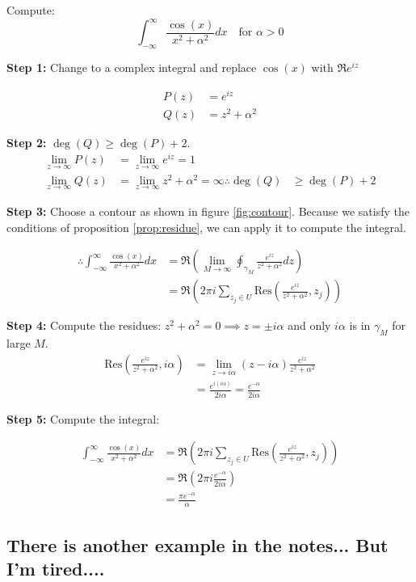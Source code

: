 \begin{example}
    Compute:
    $$\int_{-\infty}^{\infty} \frac{\cos(x)}{x^2 + \alpha^2} dx \quad \text{for } \alpha > 0$$

    \textbf{Step 1:} Change to a complex integral and replace $\cos(x)$ with $\Re{e^{iz}}$

    \begin{align*}
        P(z) & = e^{iz}         \\
        Q(z) & = z^2 + \alpha^2
    \end{align*}

    \textbf{Step 2:} $\deg(Q) \geq \deg(P) + 2$.
    \begin{align}
        \lim_{z \to \infty} P(z) & = \lim_{z \to \infty} e^{iz} = 1              \\
        \lim_{z \to \infty} Q(z) & = \lim_{z \to \infty} z^2 + \alpha^2 = \infty
        \therefore \deg(Q)       & \geq \deg(P) + 2
    \end{align}

    \textbf{Step 3:} Choose a contour as shown in figure \ref{fig:contour}. Because we satisfy the conditions of proposition \ref{prop:residue}, we can apply it to compute the integral.

    \begin{align}
        \therefore \int_{-\infty}^{\infty} \frac{\cos(x)}{x^2 + \alpha^2} dx & = \Re{\left(\lim_{M\to \infty}\oint_{\gamma_M} \frac{e^{iz}}{z^2 + \alpha^2} dz\right)}               \\
                                                                             & = \Re{\left(2\pi i \sum_{z_j \in U} \text{Res}\left(\frac{e^{iz}}{z^2 + \alpha^2}, z_j\right)\right)}
    \end{align}

    \textbf{Step 4:} Compute the residues:
    $z^2 + \alpha^2 = 0 \implies z = \pm i\alpha$ and only $i\alpha$ is in $\gamma_M$ for large $M$.
    \begin{align}
        \text{Res}\left(\frac{e^{iz}}{z^2 + \alpha^2}, i\alpha\right) & = \lim_{z \to i\alpha} (z - i\alpha)\frac{e^{iz}}{z^2 + \alpha^2} \\
                                                                      & = \frac{e^{i(i\alpha)}}{2i\alpha} = \frac{e^{-\alpha}}{2i\alpha}
    \end{align}

    \textbf{Step 5:} Compute the integral:

    \begin{align}
        \int_{-\infty}^{\infty} \frac{\cos(x)}{x^2 + \alpha^2} dx & = \Re{\left(2\pi i \sum_{z_j \in U} \text{Res}\left(\frac{e^{iz}}{z^2 + \alpha^2}, z_j\right)\right)} \\
                                                                  & = \Re{\left(2\pi i \frac{e^{-\alpha}}{2i\alpha}\right)}                                               \\
                                                                  & = \frac{\pi e^{-\alpha}}{\alpha}
    \end{align}
\end{example}

\subsection{There is another example in the notes... But I'm tired....}